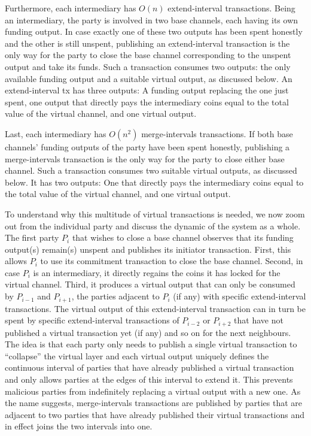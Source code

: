   Furthermore, each intermediary has $O(n)$ extend-interval transactions.
  Being an intermediary, the party is involved in two base channels, each having
  its own funding output. In case exactly one of these two outputs has been spent
  honestly and the other is still unspent,
  publishing an extend-interval transaction is the only way for the party to
  close the base channel corresponding to the unspent output and take its funds.
  Such a transaction consumes two outputs: the only
  available funding output and a suitable virtual output, as discussed below. An
  extend-interval tx has three outputs: A funding output replacing the one just
  spent, one output that directly pays the intermediary coins equal to the total
  value of the virtual channel, and one virtual output.

  Last, each intermediary has $O(n^2)$ merge-intervals transactions. If both
  base channels' funding outputs of the party have been spent honestly, publishing a merge-intervals
  transaction is the only way for the party to close either base channel. Such a
  transaction consumes two suitable virtual outputs, as discussed below. It has
  two outputs: One that directly pays the intermediary coins equal to the total
  value of the virtual channel, and one virtual output.

  To understand why this multitude of virtual transactions is needed, we now
  zoom out from the individual party and discuss the dynamic of the system as a
  whole. The first party $P_i$ that wishes to close a base channel observes that
  its funding output(s) remain(s) unspent and publishes its initiator
  transaction. First, this allows $P_i$ to use its commitment transaction to
  close the base channel. Second, in case $P_i$ is an intermediary, it directly
  regains the coins it has locked for the virtual channel. Third, it produces a
  virtual output that can only be consumed by $P_{i-1}$ and $P_{i+1}$, the
  parties adjacent to $P_i$ (if any) with specific extend-interval transactions.
  The virtual output of this extend-interval transaction can in turn be spent by
  specific extend-interval transactions of $P_{i-2}$ or $P_{i+2}$ that have not
  published a virtual transaction yet (if any) and so on for the next neighbours. The
  idea is that each party only needs to publish a single virtual transaction to
  ``collapse'' the virtual layer and each virtual output uniquely defines the
  continuous interval of parties that have already published a virtual
  transaction and only allows parties at the edges of this interval to extend it.
  This prevents malicious parties from indefinitely replacing a virtual output
  with a new one. As the name suggests, merge-intervals transactions are
  published by parties that are adjacent to two parties that have already
  published their virtual transactions and in effect joins the two intervals into
  one.

